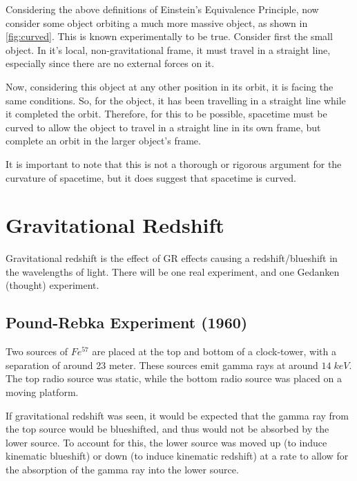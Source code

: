 Considering the above definitions of Einstein's Equivalence Principle, now consider some object orbiting a much more massive object, as shown in \vref{fig:curved}. This is known experimentally to be true. Consider first the small object. In it's local, non-gravitational frame, it must travel in a straight line, especially since there are no external forces on it. \par Now, considering this object at any other position in its orbit, it is facing the same conditions. So, for the object, it has been travelling in a straight line while it completed the orbit. Therefore, for this to be possible, spacetime must be curved to allow the object to travel in a straight line in its own frame, but complete an orbit in the larger object's frame. \par It is important to note that this is not a thorough or rigorous argument for the curvature of spacetime, but it does suggest that spacetime is curved.

\section{Gravitational Redshift}

Gravitational redshift is the effect of GR effects causing a redshift/blueshift in the wavelengths of light. There will be one real experiment, and one Gedanken (thought) experiment.

\subsection{Pound-Rebka Experiment (1960)}
Two sources of $Fe^{57}$ are placed at the top and bottom of a clock-tower, with a separation of around 23 meter. These sources emit gamma rays at around $14\;keV$. The top radio source was static, while the bottom radio source was placed on a moving platform. \par If gravitational redshift was seen, it would be expected that the gamma ray from the top source would be blueshifted, and thus would not be absorbed by the lower source. To account for this, the lower source was moved up (to induce kinematic blueshift) or down (to induce kinematic redshift) at a rate to allow for the absorption of the gamma ray into the lower source. 


